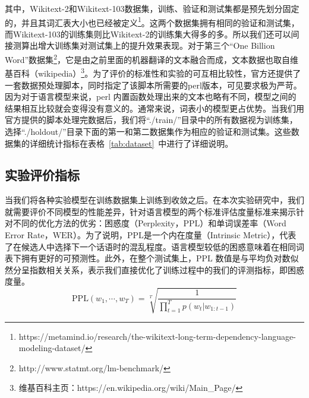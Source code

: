 其中，Wikitext-2和Wikitext-103数据集，训练、验证和测试集都是预先划分固定的，并且其词汇表大小也已经被定义\footnote{https://metamind.io/research/the-wikitext-long-term-dependency-language-modeling-dataset/}。这两个数据集拥有相同的验证和测试集，而Wikitext-103的训练集则比Wikitext-2的训练集大得多的多。所以我们还可以间接测算出增大训练集对测试集上的提升效果表现。对于第三个``One Billion Word''数据集\footnote{http://www.statmt.org/lm-benchmark/}，它是由之前里面的机器翻译的文本融合而成，文本数据也取自维基百科（wikipedia）\footnote{维基百科主页：https://en.wikipedia.org/wiki/Main\_Page/}。为了评价的标准性和实验的可互相比较性，官方还提供了一套数据预处理脚本，同时指定了该脚本所需要的perl版本，可见要求极为严苛。因为对于语言模型来说，perl 内置函数处理出来的文本也略有不同，模型之间的结果相互比较就会变得没有意义的。通常来说，词表小的模型更占优势。当我们用官方提供的脚本处理完数据后，我们将``./train/''目录中的所有数据视为训练集，选择``./holdout/''目录下面的第一和第二数据集作为相应的验证和测试集。这些数据集的详细统计指标在表格~\ref{tab:dataset}~中进行了详细说明。

\subsection{实验评价指标}
当我们将各种实验模型在训练数据集上训练到收敛之后。在本次实验研究中，我们就需要评价不同模型的性能差异，针对语言模型的两个标准评估度量标准来揭示针对不同的优化方法的优劣：困惑度（Perplexity，$ \mathrm{PPL} $）和单词误差率（Word Error Rate，$\mathrm{WER} $）。为了说明，$ \mathrm{PPL} $是一个内在度量（Intrinsic Metric），代表了在候选人中选择下一个话语时的混乱程度。语言模型较低的困惑意味着在相同词表下拥有更好的可预测性。此外，在整个测试集上，$\mathrm{PPL}$ 数值是与平均负对数似然分呈指数相关关系，表示我们直接优化了训练过程中的我们的评测指标，即困惑度量。
\begin{equation}\label{equ:ppl}
   \mathrm{PPL}(w_1,\cdots,w_T)=\sqrt[T]{\frac{1}{\prod_{t=1}^T p(w_t|w_{1:t-1})}}
\end{equation}

